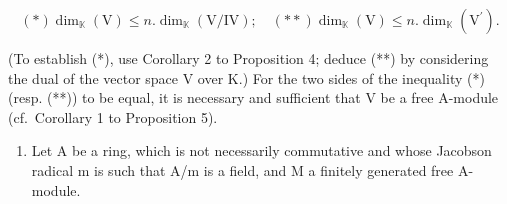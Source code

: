 \[
(*) \dim_ {\mathbb {K}} (\mathrm{V}) \leqslant n. \dim_ {\mathbb {K}} (\mathrm{V} / \mathrm{IV}); \quad (* *) \dim_ {\mathbb {K}} (\mathrm{V}) \leqslant n. \dim_ {\mathbb {K}} (\mathrm{V} ^ {\prime}).
\]

(To establish (*), use Corollary 2 to Proposition 4; deduce (**) by considering the dual of the vector space V over K.) For the two sides of the inequality (*) (resp. (**)) to be equal, it is necessary and sufficient that V be a free A-module (cf.~Corollary 1 to Proposition 5).

\begin{enumerate}
\def\labelenumi{\arabic{enumi}.}
\setcounter{enumi}{13}
\tightlist
\item
  Let A be a ring, which is not necessarily commutative and whose Jacobson radical m is such that A/m is a field, and M a finitely generated free A-module.
\end{enumerate}

